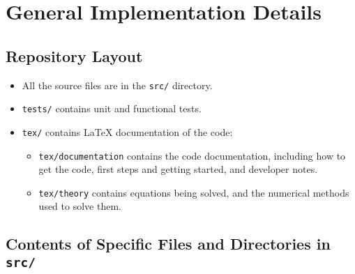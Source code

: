 \newpage



\section{General Implementation Details}



\subsection{Repository Layout}

\begin{itemize} 

    \item 	All the source files are in the \verb|src/| directory.

    \item 	\verb|tests/| contains unit and functional tests.
	
    \item   \verb|tex/| contains LaTeX documentation of the code:

    \begin{itemize}
        \item   \verb|tex/documentation| contains the code documentation,
                including how to get the code, first steps and getting started,
                and developer notes.

        \item   \verb|tex/theory| contains equations being solved, and the 
                numerical methods used to solve them.
    \end{itemize}
\end{itemize}







\subsection{Contents of Specific Files and Directories in \texttt{src/}}

